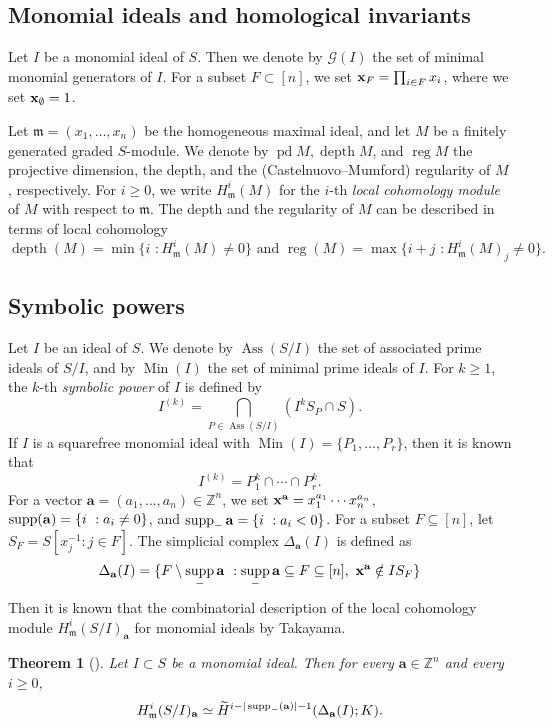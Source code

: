 \documentclass[12pt]{amsart}
\newtheorem{thm}{Theorem}[section]
\theoremstyle{definition}
\theoremstyle{remark}
\DeclareMathOperator{\depth}{depth}
\DeclareMathOperator{\pd}{pd}
\DeclareMathOperator{\Ass}{Ass}
\DeclareMathOperator{\supp}{supp}
\DeclareMathOperator{\reg}{reg}
\DeclareMathOperator{\Min}{Min}
\begin{document}
\subsection{Monomial ideals and homological invariants}
Let $I$ be a monomial ideal of $S$. Then we denote by $\mathcal{G}(I)$ the set of minimal monomial generators of $I$. For a subset $F\subset[n]$, we set ${\bf x}_{F}=\prod_{i\in F}x_{i}$, where we set ${\bf x}_{\emptyset}=1$. 

Let $\mathfrak{m}=(x_{1},\ldots, x_{n})$ be the homogeneous maximal ideal, and let $M$ be a finitely generated graded $S$-module. We denote by $\pd M,\depth M$, and $\reg M$ the projective dimension, the depth, and the (Castelnuovo--Mumford) regularity of $M$, respectively. For $i \geq 0$, we write $H^i_{\mathfrak{m}}(M)$ for the $i$-th {\it local cohomology module} of $M$ with respect to $\mathfrak{m}$. The depth and the regularity of $M$ can be described in terms of local cohomology 
$$\depth(M)=\min\{i\,\,:H^i_{\mathfrak{m}}(M)\neq 0\}\mbox{ and }\reg(M)=\max\{i+j\,\,: H^{i}_{\mathfrak{m}}(M)_{j}\neq 0\}.$$

\subsection{Symbolic powers}
Let $I$ be an ideal of $S$. We denote by $\Ass(S/I)$ the set of associated prime ideals of $S/I$, and by $\Min(I)$ the set of minimal prime ideals of $I$. For $k\geq1$, the $k$-th {\it symbolic power} of $I$ is defined by $$I^{(k)}=\bigcap_{P\in\Ass(S/I)}(I^k S_P \cap S).$$
If $I$ is a squarefree monomial ideal with $\Min(I)=\{P_{1},\ldots, P_{r}\}$, then it is known that $$I^{(k)}=P_{1}^{k}\cap\cdots\cap P_{r}^{k}.$$
For a vector $\mathbf{a} = (a_1,\dots,a_n) \in \mathbb{Z}^n$, we set ${\textbf x}^{\mathbf{a}} = x_1^{a_1}\cdots x_n^{a_n}$, $\supp({\bf a})=\{i\,\,:a_{i}\neq0\}$, and $\supp_{-}{\bf a}=\{i\,\,: a_{i}<0\}$. For a subset $F \subseteq [n]$, let $S_F = S[x_j^{-1} : j \in F]$. The simplicial complex $\Delta_{\mathbf{a}}(I)$ is defined as
$$\Delta_{\mathbf{a}}(I)=\{F\setminus\supp_{-}{\bf a}\,\,:\supp_{-}{\bf a} \subseteq F \subseteq [n], \ {\textbf x}^{\mathbf{a}} \notin I S_{F}\}$$
Then it is known that the combinatorial description of the local cohomology module $H^i_{\mathfrak{m}}(S/I)_{\mathbf{a}}$ for monomial ideals by Takayama.  
\begin{thm}[{\normalfont\cite[Theorem 1]{t2005}}]
\label{thm:Takayama}
Let $I\subset S$ be a monomial ideal. Then for every $\mathbf{a} \in \mathbb{Z}^n$ and every $i \geq 0$,
$$H^{i}_{\mathfrak{m}}(S/I)_{\bf a}\simeq\widetilde{H}^{i-|\supp_-({\mathbf{a}})|-1}(\Delta_{\bf a}(I);K).$$
\end{thm}
\end{document}

